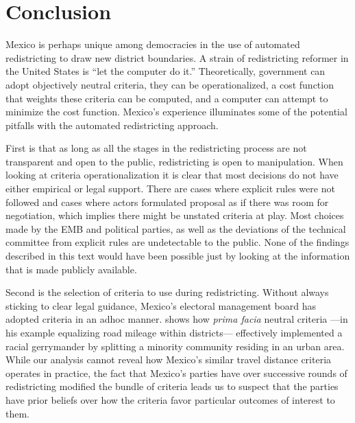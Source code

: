 \documentclass[letter,12pt]{article}
\begin{document}

\section{Conclusion}

Mexico is perhaps unique among democracies in the use of automated redistricting to draw new district boundaries. A strain of redistricting reformer in the United States is ``let the computer do it.'' Theoretically, government can adopt objectively neutral criteria, they can be operationalized, a cost function that weights these criteria can be computed, and a computer can attempt to minimize the cost function. Mexico's experience illuminates some of the potential pitfalls with the automated redistricting approach.

First is that as long as all the stages in the redistricting process are not transparent and open to the public, redistricting is open to manipulation. When looking at criteria operationalization it is clear that most decisions do not have either empirical or legal support.  There are cases where explicit rules were not followed and cases where actors formulated proposal as if there was  room for negotiation, which implies there might be unstated criteria at play. Most choices made by the EMB and political parties,  as well as the deviations of the technical committee from explicit rules are undetectable to the public.  None of the findings described in this text would have been possible just by looking at the information that is made publicly available. 

Second is the selection of criteria to use during redistricting. Without always sticking to clear legal guidance, Mexico's electoral management board has adopted criteria in an adhoc manner. \citet{parker.1990} shows how \emph{prima facia} neutral criteria ---in his example equalizing road mileage within districts--- effectively implemented a racial gerrymander by splitting a minority community residing in an urban area. While our analysis cannot reveal how Mexico's similar travel distance criteria operates in practice, the fact that Mexico's parties have over successive rounds of redistricting modified the bundle of criteria leads us to suspect that the parties have prior beliefs over how the criteria favor particular outcomes of interest to them.
\end{document}
